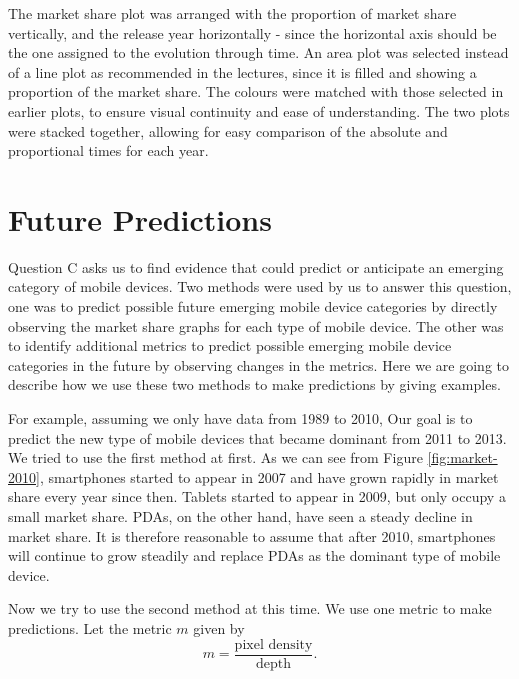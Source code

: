 \documentclass[conference]{IEEEtran}
\begin{document}
The market share plot was arranged with the proportion of market share vertically, and the release year horizontally - since the horizontal axis should be the one assigned to the evolution through time. An area plot was selected instead of a line plot as recommended in the lectures, since it is filled and showing a proportion of the market share.
The colours were matched with those selected in earlier plots, to ensure visual continuity and ease of understanding.
The two plots were stacked together, allowing for easy comparison of the absolute and proportional times for each year.

\section{Future Predictions}
Question C asks us to find evidence that could predict or anticipate an emerging category of mobile devices. Two methods were used by us to answer this question, one was to predict possible future emerging mobile device categories by directly observing the market share graphs for each type of mobile device. The other was to identify additional metrics to predict possible emerging mobile device categories in the future by observing changes in the metrics. Here we are going to describe how we use these two methods to make predictions by giving examples.

For example, assuming we only have data from 1989 to 2010, Our goal is to predict the new type of mobile devices that became dominant from 2011 to 2013. We tried to use the first method at first. As we can see from Figure \ref{fig:market-2010}, smartphones started to appear in 2007 and have grown rapidly in market share every year since then. Tablets started to appear in 2009, but only occupy a small market share. PDAs, on the other hand, have seen a steady decline in market share. It is therefore reasonable to assume that after 2010, smartphones will continue to grow steadily and replace PDAs as the dominant type of mobile device.

Now we try to use the second method at this time. We use one metric to make predictions. Let the metric $m$ given by
\[ m = \frac{\text{pixel density}}{\text{depth}}. \]
\end{document}
